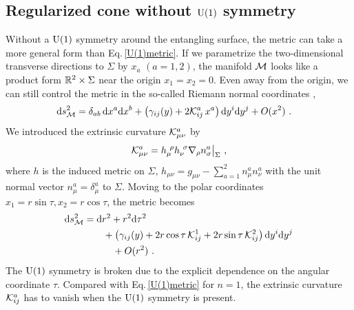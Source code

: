 \subsection{Regularized cone without $\mathrm{U}(1)$ symmetry}\label{ss:Reg_Cone_no_U(1)}
Without a $\mathrm{U}(1)$ symmetry around the entangling surface, the metric can take a more general form than Eq.\,\eqref{U(1)metric}.
If we parametrize the two-dimensional transverse directions to $\Sigma$ by $x_a$ $(a=1,2)$, the manifold ${\cal M}$ looks like a product form $\mathbb{R}^2 \times \Sigma$ near the origin $x_1=x_2 = 0$.
Even away from the origin, we can still control the metric in the so-called Riemann normal coordinates \cite{Lewkowycz:2013nqa,Fursaev:2013fta,Rosenhaus:2014woa},
\begin{align}
\begin{aligned}
	\mathrm{d} s^2_{{\cal M}} &=  \delta_{ab}\, \mathrm{d} x^a \mathrm{d} x^b + \left(\gamma_{ij}(y) + 2{\cal K}^a_{ij} \, x^a \right) \mathrm{d} y^i \mathrm{d} y^j + O(x^2) \ .
\end{aligned}
\end{align}
We introduced the extrinsic curvature ${\cal K}^a_{\mu\nu}$ by
\begin{align}\label{ExtrinsicCurvature}
{\cal K}^a_{\mu\nu} = h_\mu^{~\rho} h_\nu^{~\sigma} \nabla_\rho n^a_\sigma \big|_{\Sigma}\ , 
\end{align}
where $h$ is the induced metric on $\Sigma$, $h_{\mu\nu} = g_{\mu\nu} - \sum_{a=1}^2 n^a_\mu n^a_\nu$ with the unit normal vector $n^a_\mu = \delta^a_\mu$ to $\Sigma$.
Moving to the polar coordinates $x_1 = r\sin\tau, x_2 = r\cos\tau$, the metric becomes 
\begin{align}
\begin{aligned}
	\mathrm{d} s^2_{{\cal M}} &= \mathrm{d} r^2 + r^2 \mathrm{d}\tau^2 \\
		&\qquad + \left( \gamma_{ij}(y) + 2r \cos\tau\, {\cal K}^1_{ij} + 2r \sin\tau\,{\cal K}^2_{ij} \right) \mathrm{d} y^i \mathrm{d} y^j\\
		&\qquad\quad + O(r^2)\ .
\end{aligned}
\end{align}
The $\mathrm{U}(1)$ symmetry is broken due to the explicit dependence on the angular coordinate $\tau$.
Compared with Eq.\,\eqref{U(1)metric} for $n=1$, the extrinsic curvature ${\cal K}^a_{ij}$ has to vanish when the $\mathrm{U}(1)$ symmetry is present.

